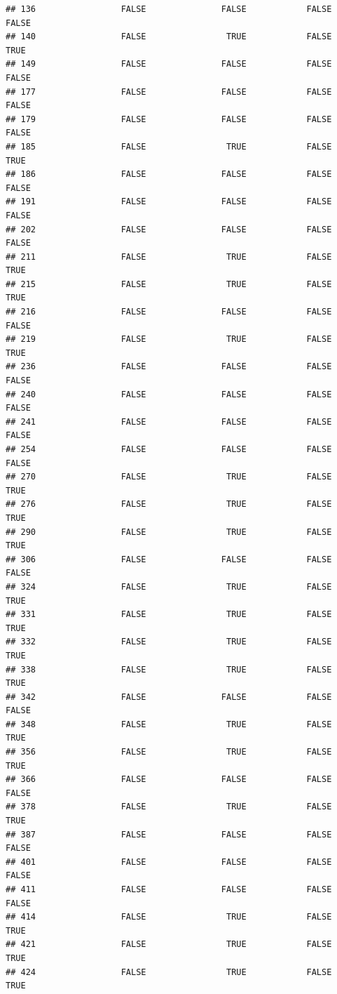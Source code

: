 \documentclass[
]{article}
\begin{document}
\begin{verbatim}
## 136                 FALSE               FALSE            FALSE  FALSE
## 140                 FALSE                TRUE            FALSE   TRUE
## 149                 FALSE               FALSE            FALSE  FALSE
## 177                 FALSE               FALSE            FALSE  FALSE
## 179                 FALSE               FALSE            FALSE  FALSE
## 185                 FALSE                TRUE            FALSE   TRUE
## 186                 FALSE               FALSE            FALSE  FALSE
## 191                 FALSE               FALSE            FALSE  FALSE
## 202                 FALSE               FALSE            FALSE  FALSE
## 211                 FALSE                TRUE            FALSE   TRUE
## 215                 FALSE                TRUE            FALSE   TRUE
## 216                 FALSE               FALSE            FALSE  FALSE
## 219                 FALSE                TRUE            FALSE   TRUE
## 236                 FALSE               FALSE            FALSE  FALSE
## 240                 FALSE               FALSE            FALSE  FALSE
## 241                 FALSE               FALSE            FALSE  FALSE
## 254                 FALSE               FALSE            FALSE  FALSE
## 270                 FALSE                TRUE            FALSE   TRUE
## 276                 FALSE                TRUE            FALSE   TRUE
## 290                 FALSE                TRUE            FALSE   TRUE
## 306                 FALSE               FALSE            FALSE  FALSE
## 324                 FALSE                TRUE            FALSE   TRUE
## 331                 FALSE                TRUE            FALSE   TRUE
## 332                 FALSE                TRUE            FALSE   TRUE
## 338                 FALSE                TRUE            FALSE   TRUE
## 342                 FALSE               FALSE            FALSE  FALSE
## 348                 FALSE                TRUE            FALSE   TRUE
## 356                 FALSE                TRUE            FALSE   TRUE
## 366                 FALSE               FALSE            FALSE  FALSE
## 378                 FALSE                TRUE            FALSE   TRUE
## 387                 FALSE               FALSE            FALSE  FALSE
## 401                 FALSE               FALSE            FALSE  FALSE
## 411                 FALSE               FALSE            FALSE  FALSE
## 414                 FALSE                TRUE            FALSE   TRUE
## 421                 FALSE                TRUE            FALSE   TRUE
## 424                 FALSE                TRUE            FALSE   TRUE

\end{verbatim}
\end{document}
